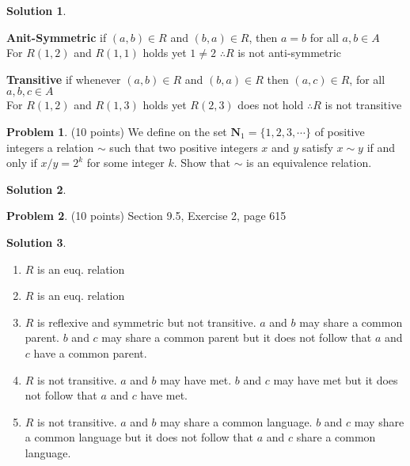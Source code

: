 \documentclass{article}
\theoremstyle{definition}
\newtheorem{problem}{Problem}
\newtheorem*{solution}{Solution}
\newcommand{\N}{\mathbf{N}}
\begin{document}
\begin{solution}
\begin{enumerate}[label=(\alph*)]
      \textbf{Anit-Symmetric} if $(a,b) \in R$ and $(b,a) \in R$, then $a=b$ for all $a,b \in A$ \\
      For $R(1,2)$ and $R(1,1)$ holds yet $1 \neq 2$
      $\therefore R$ is not anti-symmetric 
    
      \textbf{Transitive} if whenever $(a,b) \in R$ and $(b,a) \in R$ then $(a,c) \in R$, for all $a,b,c \in A$ \\
      For $R(1,2)$ and $R(1,3)$ holds yet $R(2,3)$ does not hold
      $\therefore R$ is not transitive

  \end{enumerate}
\end{solution}

\begin{problem} (10 points)
We define on the set $\N_1=\{1,2,3,\cdots\}$ of positive integers a
relation $\sim$ such that two positive integers $x$ and $y$ satisfy
$x\sim y$ if and only if $x/y=2^k$ for some integer $k$. 
Show that $\sim$ is an equivalence relation.
\end{problem}
\begin{solution} 
\end{solution}

\begin{problem} (10 points)
Section 9.5, Exercise 2, page 615
\end{problem}
\begin{solution} \ \\
  \begin{enumerate}[label=(\alph*)]
    \item $R$ is an euq. relation
    \item $R$ is an euq. relation
    \item $R$ is reflexive and symmetric but not transitive. $a$ and $b$ may share a common parent. $b$ and $c$ may share a common parent but it does not follow that $a$ and $c$ have a common parent.
    \item $R$ is not transitive. $a$ and $b$ may have met. $b$ and $c$ may have met but it does not follow that $a$ and $c$ have met.
    \item $R$ is not transitive. $a$ and $b$ may share a common language. $b$ and $c$ may share a common language but it does not follow that $a$ and $c$ share a common language.
  \end{enumerate}
\end{solution}
\end{document}
